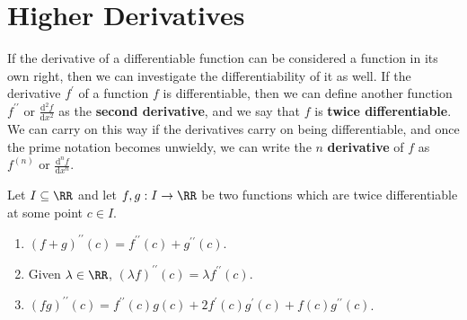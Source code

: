 \documentclass[../real_analysis.tex]{subfiles}
\begin{document}
    \section{Higher Derivatives}
        If the derivative of a differentiable function can be considered a function in its own right, then we can investigate the differentiability of it as well. If the derivative $f^\prime$ of a function $f$ is differentiable, then we can define another function $f^{\prime\prime}$ or $\frac{\mathrm{d}^2f}{\mathrm{d}x^2}$ as the \textbf{second derivative}, and we say that $f$ is \textbf{twice differentiable}. We can carry on this way if the derivatives carry on being differentiable, and once the prime notation becomes unwieldy, we can write the $n$ \textbf{derivative} of $f$ as $f^{(n)}$ or $\frac{\mathrm{d}^nf}{\mathrm{d}x^n}$.
        \begin{theorem}\label{2-diff-func-props}
            Let $I\subseteq\RR$ and let $f,g:I\to\RR$ be two functions which are twice differentiable at some point $c\in I$.
            \begin{enumerate}[label={\upshape(\roman*)}]
                \item $(f+g)^{\prime\prime}(c)=f^{\prime\prime}(c)+g^{\prime\prime}(c)$.
                \item Given $\lambda\in\RR$, $(\lambda f)^{\prime\prime}(c)=\lambda f^{\prime\prime}(c)$.
                \item $(fg)^{\prime\prime}(c)=f^{\prime\prime}(c)g(c)+2f^\prime(c)g^\prime(c)+f(c)g^{\prime\prime}(c)$.
            \end{enumerate}
        \end{theorem}
\end{document}
